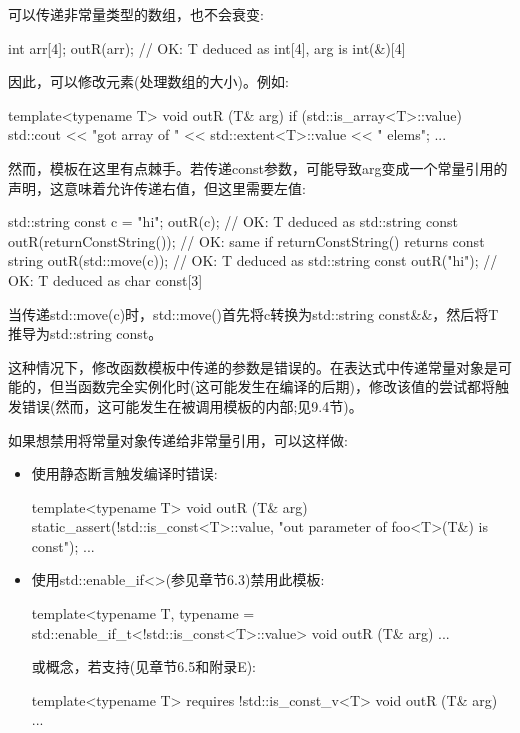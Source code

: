 可以传递非常量类型的数组，也不会衰变:

\begin{cpp}
int arr[4];
outR(arr); // OK: T deduced as int[4], arg is int(&)[4]
\end{cpp}

因此，可以修改元素(处理数组的大小)。例如:

\begin{cpp}
template<typename T>
void outR (T& arg) {
	if (std::is_array<T>::value) {
		std::cout << "got array of " << std::extent<T>::value << " elems\n";
	}
	...
}
\end{cpp}

然而，模板在这里有点棘手。若传递const参数，可能导致arg变成一个常量引用的声明，这意味着允许传递右值，但这里需要左值:

\begin{cpp}
std::string const c = "hi";
outR(c); // OK: T deduced as std::string const
outR(returnConstString()); // OK: same if returnConstString() returns const string
outR(std::move(c)); // OK: T deduced as std::string const
outR("hi"); // OK: T deduced as char const[3]
\end{cpp}

\begin{notice}
当传递std::move(c)时，std::move()首先将c转换为std::string const\&\&，然后将T推导为std::string const。
\end{notice}

这种情况下，修改函数模板中传递的参数是错误的。在表达式中传递常量对象是可能的，但当函数完全实例化时(这可能发生在编译的后期)，修改该值的尝试都将触发错误(然而，这可能发生在被调用模板的内部;见9.4节)。

如果想禁用将常量对象传递给非常量引用，可以这样做:

\begin{itemize}
\item 
使用静态断言触发编译时错误:

\begin{cpp}
template<typename T>
void outR (T& arg) {
	static_assert(!std::is_const<T>::value,
				  "out parameter of foo<T>(T&) is const");
	...
}
\end{cpp}

\item 
使用std::enable\_if<>(参见章节6.3)禁用此模板:

\begin{cpp}
template<typename T,
		 typename = std::enable_if_t<!std::is_const<T>::value>
void outR (T& arg) {
	...
}
\end{cpp}

或概念，若支持(见章节6.5和附录E):

\begin{cpp}
template<typename T>
requires !std::is_const_v<T>
void outR (T& arg) {
	...
}
\end{cpp}

\end{itemize}

